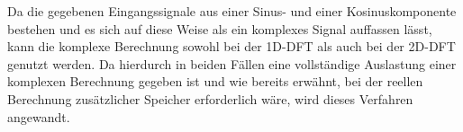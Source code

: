 Da die gegebenen Eingangssignale aus einer Sinus- und einer Kosinuskomponente bestehen und es sich auf diese Weise als ein komplexes Signal auffassen lässt, kann die 
komplexe Berechnung sowohl bei der 1D-DFT als auch bei der 2D-DFT genutzt werden. 
Da hierdurch in beiden Fällen eine vollständige Auslastung einer komplexen Berechnung gegeben ist und wie bereits erwähnt, bei der reellen Berechnung zusätzlicher Speicher 
erforderlich wäre, wird dieses Verfahren angewandt.



